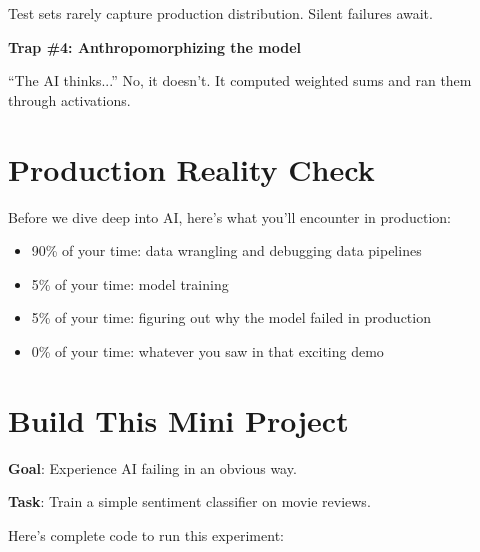 Test sets rarely capture production distribution. Silent failures await.

\textbf{Trap \#4: Anthropomorphizing the model}

``The AI thinks...'' No, it doesn't. It computed weighted sums and ran them through activations.

\section{Production Reality Check}

Before we dive deep into AI, here's what you'll encounter in production:

\begin{itemize}
\item 90\% of your time: data wrangling and debugging data pipelines
\item 5\% of your time: model training
\item 5\% of your time: figuring out why the model failed in production
\item 0\% of your time: whatever you saw in that exciting demo
\end{itemize}

\section{Build This Mini Project}

\textbf{Goal}: Experience AI failing in an obvious way.

\textbf{Task}: Train a simple sentiment classifier on movie reviews.

Here's complete code to run this experiment:

